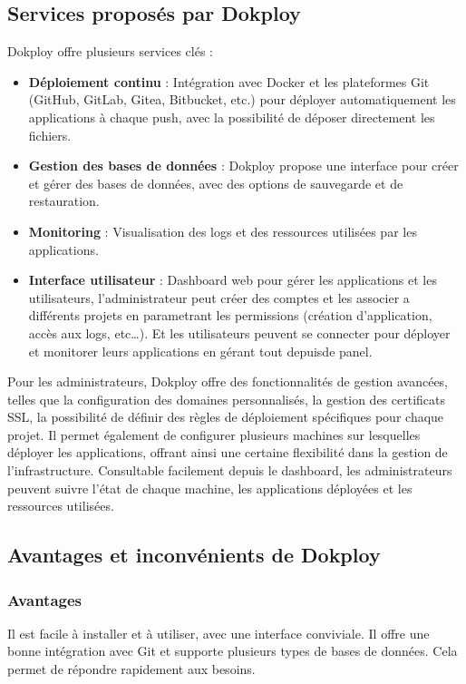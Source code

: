 \documentclass{report} %
\begin{document}
\subsection{Services proposés par Dokploy}
Dokploy offre plusieurs services clés :
\begin{itemize}
\item \textbf{Déploiement continu} : Intégration avec Docker et les plateformes Git (GitHub, GitLab, Gitea, Bitbucket, etc.)
pour déployer automatiquement les applications à chaque push, avec la possibilité de déposer directement les fichiers.
\item \textbf{Gestion des bases de données} : %
Dokploy propose une interface pour créer et gérer des bases de données, avec des options de sauvegarde et de restauration.
\item \textbf{Monitoring} : Visualisation des logs et des ressources utilisées par les applications.
\item \textbf{Interface utilisateur} : Dashboard web pour gérer les applications et les utilisateurs, 
l'administrateur peut créer des comptes et les associer a différents projets en parametrant 
les permissions (création d'application, accès aux logs, etc\dots).
Et les utilisateurs peuvent se connecter pour déployer et monitorer leurs applications en gérant tout depuisde panel.
\end{itemize}

Pour les administrateurs, Dokploy offre des fonctionnalités de gestion avancées, telles que la configuration des domaines
personnalisés, la gestion des certificats SSL, la possibilité de définir des règles de déploiement spécifiques pour chaque projet.
Il permet également de configurer plusieurs machines sur lesquelles déployer les applications, offrant ainsi une certaine 
flexibilité dans la gestion de l'infrastructure. Consultable facilement depuis le dashboard, les administrateurs peuvent 
suivre l'état de chaque machine, les applications déployées et les ressources utilisées.

\subsection{Avantages et inconvénients de Dokploy}
\subsubsection{Avantages}
Il est facile à installer et à utiliser, avec une interface conviviale. Il offre une bonne intégration avec Git et supporte plusieurs types de bases de données.
Cela permet de répondre rapidement aux besoins.
\end{document}

